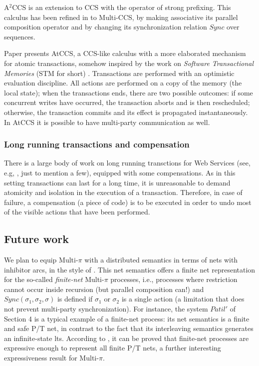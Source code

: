 \documentclass[submission,copyright,creativecommons]{eptcs}
\begin{document}
A$^2$CCS \cite{GMM} is an extension to CCS with the operator of strong prefixing. This calculus has been
refined in \cite{GV10} to Multi-CCS, by making associative its parallel composition operator and by changing its synchronization
relation $Sync$ over sequences.  

Paper \cite{ABD07} presents AtCCS, a CCS-like calculus with a more elaborated mechanism for atomic transactions, 
somehow inspired by the work on {\em Software Transactional Memories} (STM for short) \cite{HM93}. Transactions
are performed with an optimistic evaluation discipline. All actions are performed on a copy of the memory (the local state);
when the transactions ends, there are two possible outcomes: if some concurrent writes have occurred, the transaction 
aborts and is then rescheduled; otherwise, the transaction commits and its effect is propagated instantaneously.
In AtCCS it is possible to have multi-party communication as well.


\subsubsection{Long running transactions and compensation}

There is a large body of work on long running transctions for Web Services (see, e.g, \cite{BMM05,BBF+05,BHF04}, just
to mention a few), equipped with some compensations. As in this setting transactions can last for a long time, it is 
unreasonable to demand atomicity and isolation in the execution of a transaction. Therefore, in case of failure,
a compensation (a piece of code) is to be executed in order to undo most of the visible actions that have been
performed.


\subsection{Future work}

We plan to equip Multi-$\pi$ with
a distributed semantics in terms of nets with inhibitor arcs, in the style of \cite{BG09}. 
This net semantics offers a finite net representation for the so-called {\em finite-net} Multi-$\pi$ processes,
i.e., processes where restriction cannot occur inside recursion (but parallel composition can!)
and $Sync(\sigma_1, \sigma_2, \sigma)$ is defined if $\sigma_1$ or $\sigma_2$ is a single action (a limitation
that does not prevent multi-party synchronization). For instance, the system $Patil'$ of Section 4 is a typical example
of a finite-net process: its net semantics is a finite and safe P/T net, in contrast to the fact that its interleaving semantics
generates an infinite-state lts. According to \cite{GV10}, it can be proved that finite-net processes are expressive 
enough to represent all finite P/T nets, a further interesting expressiveness result for Multi-$\pi$. 
\end{document}
